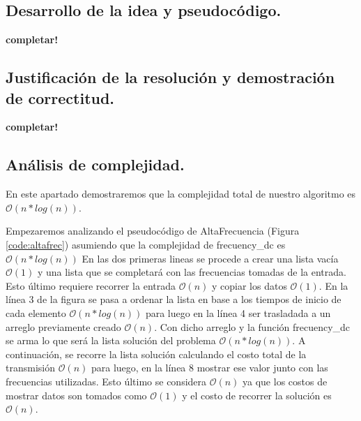 


\newpage
\subsection{Desarrollo de la idea y pseudocódigo.}

\vspace*{0.3cm}

\textbf{completar!}

\newpage
\subsection{Justificación de la resolución y demostración de correctitud.}

\vspace*{0.3cm}

\textbf{completar!}



\newpage
\subsection{Análisis de complejidad.}

\vspace*{0.3cm}

En este apartado demostraremos que la complejidad total de nuestro algoritmo es $\mathcal{O}(n*log(n))$.

Empezaremos analizando el pseudocódigo de AltaFrecuencia (Figura \ref{code:altafrec}) asumiendo que la complejidad de frecuency_dc es $\mathcal{O}(n*log(n))$
En las dos primeras lineas se procede a crear una lista vacía $\mathcal{O}(1)$ y una lista que se completará con las frecuencias tomadas de la entrada. Esto último requiere recorrer la entrada $\mathcal{O}(n)$ y copiar los datos $\mathcal{O}(1)$.
En la línea 3 de la figura se pasa a ordenar la lista en base a los tiempos de inicio de cada elemento $\mathcal{O}(n*log(n))$ para luego en la línea 4 ser trasladada a un arreglo previamente creado $\mathcal{O}(n)$. Con dicho arreglo y la función frecuency_dc se arma lo que será la lista solución del problema $\mathcal{O}(n*log(n))$. A continuación, se recorre la lista solución calculando el costo total de la transmisión $\mathcal{O}(n)$ para luego, en la línea 8 mostrar ese valor junto con las frecuencias utilizadas. Esto último se considera $\mathcal{O}(n)$ ya que los costos de mostrar datos son tomados como $\mathcal{O}(1)$ y el costo de recorrer la solución es $\mathcal{O}(n)$.

